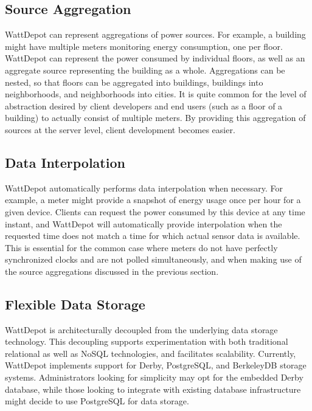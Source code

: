 \subsection{Source Aggregation}

WattDepot can represent aggregations of power sou\-rces. For example, a building might have multiple meters monitoring energy consumption, one per floor. WattDepot can represent the power consumed by individual floors, as well as an aggregate source representing the building as a whole. Aggregations can be nested, so that floors can be aggregated into buildings, buildings into neighborhoods, and neighborhoods into cities. It is quite common for the level of abstraction desired by client developers and end users (such as a floor of a building) to actually consist of multiple meters. By providing this aggregation of sources at the server level, client development becomes easier.

\subsection{Data Interpolation}

WattDepot automatically performs data interpolation when necessary. For example, a meter might provide a snapshot of energy usage once per hour for a given device. Clients can request the power consumed by this device at any time instant, and WattDepot will automatically provide interpolation when the requested time does not match a time for which actual sensor data is available. This is essential for the common case where meters do not have perfectly synchronized clocks and are not polled simultaneously, and when making use of the source aggregations discussed in the previous section.

\subsection{Flexible Data Storage}

WattDepot is architecturally decoupled from the underlying data storage technology. This decoupling supports experimentation with both traditional relational as well as NoSQL technologies, and facilitates scalability. Currently, WattDepot implements support for Derby, PostgreSQL, and BerkeleyDB storage systems. Administrators looking for simplicity may opt for the embedded Derby database, while those looking to integrate with existing database infrastructure might decide to use PostgreSQL for data storage.

